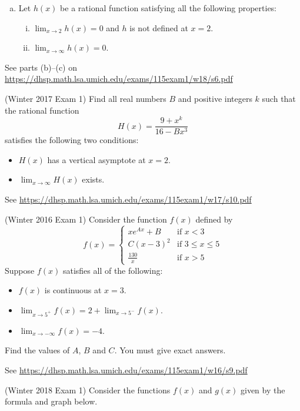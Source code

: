\documentclass[11pt]{exam}
\begin{document}
\begin{questions}
\begin{enumerate}[(a)]
\item Let $h(x)$ be a rational function satisfying all the following properties:
\begin{enumerate}[(i)]
\item$\displaystyle\lim_{x \rightarrow 2} h(x) = 0$ and $h$ is not defined at $x=2$.
\item $\displaystyle\lim_{x \rightarrow \infty} h(x) = 0$.
\end{enumerate}
\end{enumerate}
\begin{solution}
  See parts (b)--(c) on \href{https://dhsp.math.lsa.umich.edu/exams/115exam1/w18/s6.pdf}{https://dhsp.math.lsa.umich.edu/exams/115exam1/w18/s6.pdf}
\end{solution}
\question (Winter 2017 Exam 1) Find all real numbers $B$ and positive integers $k$ such that the rational function
$$H(x)= \frac{9+x^k}{16-Bx^3}$$
satisfies the following two conditions:
\begin{itemize}
\item $H(x)$ has a vertical asymptote at $x=2$.
\item $\displaystyle\lim_{x \rightarrow \infty} H(x)$ exists.
\end{itemize}
\begin{solution}
  See \href{https://dhsp.math.lsa.umich.edu/exams/115exam1/w17/s10.pdf}{https://dhsp.math.lsa.umich.edu/exams/115exam1/w17/s10.pdf}
\end{solution}
\question (Winter 2016 Exam 1)
Consider the function \(f(x)\) defined by
$$f(x) = \left\lbrace \begin{array}{ll} \! \! xe^{Ax} + B & \textrm{if } x<3 \\ \!\! C(x-3)^2 & \textrm{if } 3 \leqslant x \leqslant 5 \\ \!\! \frac{130}{x} & \textrm{if } x > 5
\end{array}\right.$$
Suppose $f(x)$ satisfies all of the following:
\begin{itemize}
\item $f(x)$ is continuous at $x=3$.
\item $\displaystyle\lim_{x \rightarrow 5^+} f(x) = 2 + \displaystyle\lim_{x \rightarrow 5^-} f(x)$.
\item $\displaystyle\lim_{x \rightarrow -\infty} f(x) = -4$.
\end{itemize}
Find the values of $A$, $B$ and $C$. You must give exact answers.
\begin{solution}
 See \href{https://dhsp.math.lsa.umich.edu/exams/115exam1/w16/s9.pdf}{https://dhsp.math.lsa.umich.edu/exams/115exam1/w16/s9.pdf}
\end{solution}
\pagebreak
\question (Winter 2018 Exam 1) Consider the functions $f(x)$ and $g(x)$ given by the formula and graph below.


\end{questions}
\end{document}
